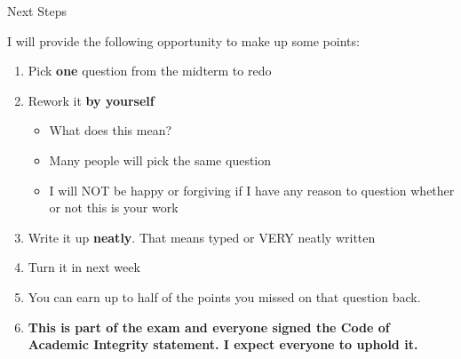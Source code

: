 \begin{frame}{Next Steps}

I will provide the following opportunity to make up some points:

\begin{enumerate}[<+->]
\def\labelenumi{\arabic{enumi}.}
\tightlist
\item
  Pick \textbf{one} question from the midterm to redo
\item
  Rework it \textbf{by yourself}

  \begin{itemize}[<+->]
  \tightlist
  \item
    What does this mean?
  \item
    Many people will pick the same question
  \item
    I will NOT be happy or forgiving if I have any reason to question
    whether or not this is your work
  \end{itemize}
\item
  Write it up \textbf{neatly}. That means typed or VERY neatly written
\item
  Turn it in next week
\item
  You can earn up to half of the points you missed on that question
  back.
\item
  \textbf{This is part of the exam and everyone signed the Code of
  Academic Integrity statement. I expect everyone to uphold it.}
\end{enumerate}

\end{frame}
